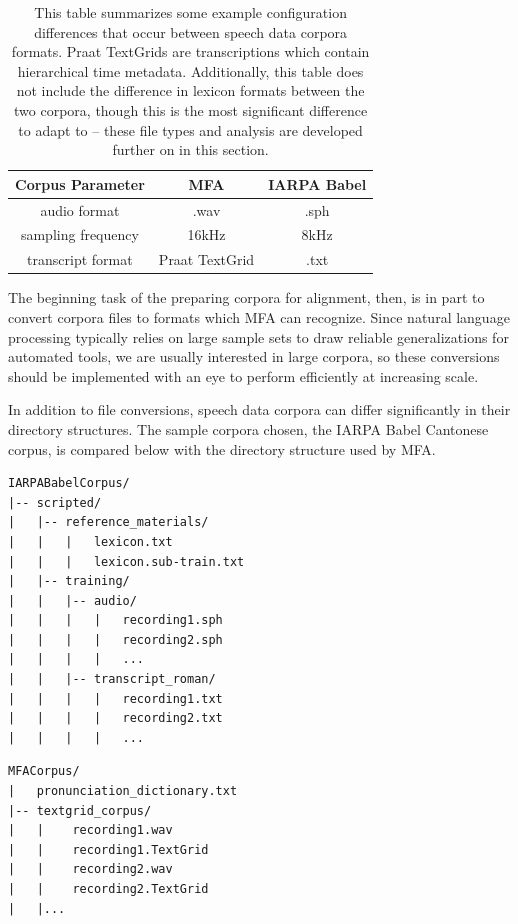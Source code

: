 \documentclass[11pt]{article}
\begin{document}
\begin{table}[h!]
\centering
\begin{tabular}{|c|c c|} 
 \hline
 Corpus Parameter & MFA & IARPA Babel \\ [0.5ex] 
 \hline
 audio format & .wav & .sph \\
 sampling frequency & 16kHz & 8kHz \\
 transcript format & Praat\cite{noauthor_praat_nodate} TextGrid & .txt \\
\hline
\end{tabular}
\caption{This table summarizes some example configuration differences that occur between speech data corpora formats. Praat TextGrids are transcriptions which contain hierarchical time metadata. Additionally, this table does not include the difference in lexicon formats between the two corpora, though this is the most significant difference to adapt to -- these file types and analysis are developed further on in this section.}
\label{table:corpus_format}
\end{table}

The beginning task of the preparing corpora for alignment, then, is in part to convert corpora files to formats which MFA can recognize. Since natural language processing typically relies on large sample sets to draw reliable generalizations for automated tools, we are usually interested in large corpora, so these conversions should be implemented with an eye to perform efficiently at increasing scale.

In addition to file conversions, speech data corpora can differ significantly in their directory structures. The sample corpora chosen, the IARPA Babel Cantonese corpus, is compared below with the directory structure used by MFA.

\begin{multicols}{2}
\begin{singlespace}
\begin{verbatim}
IARPABabelCorpus/
|-- scripted/
|   |-- reference_materials/
|   |   |   lexicon.txt
|   |   |   lexicon.sub-train.txt
|   |-- training/
|   |   |-- audio/
|   |   |   |   recording1.sph
|   |   |   |   recording2.sph
|   |   |   |   ...
|   |   |-- transcript_roman/
|   |   |   |   recording1.txt
|   |   |   |   recording2.txt
|   |   |   |   ...
\end{verbatim}
\end{singlespace}

\begin{singlespace}
\begin{verbatim}
MFACorpus/
|   pronunciation_dictionary.txt
|-- textgrid_corpus/
|   |    recording1.wav
|   |    recording1.TextGrid
|   |    recording2.wav
|   |    recording2.TextGrid
|   |...






\end{verbatim}
\end{singlespace}
\end{multicols}
\end{document}
